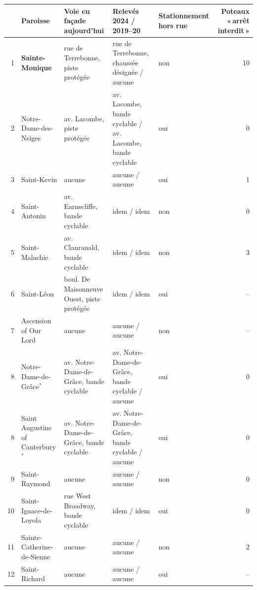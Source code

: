 \begin{tabular}{@{}r>{\raggedright\arraybackslash}p{3.4cm}>{\raggedright\arraybackslash}p{4.2cm}>{\raggedright\arraybackslash}p{4.4cm}>{\raggedright\arraybackslash}p{1.7cm}r@{}}\toprule
 & Paroisse & Voie en façade aujourd'hui & Relevés 2024 / 2019--20 & Stationnement hors rue & Poteaux «\,arrêt interdit\,» \\\midrule
1 & \textbf{Sainte-Monique} & rue de Terrebonne, piste protégée & rue de Terrebonne, chaussée désignée / aucune & non & 10 \\
2 & Notre-Dame-des-Neiges & av. Lacombe, piste protégée & av. Lacombe, bande cyclable / av. Lacombe, bande cyclable & oui & 0 \\
3 & Saint-Kevin & aucune & aucune / aucune & oui & 1 \\
4 & Saint-Antonin & av. Earnscliffe, bande cyclable & idem / idem & non & 0 \\
5 & Saint-Malachie & av. Clanranald, bande cyclable & idem / idem & non & 3 \\
6 & Saint-Léon & boul. De Maisonneuve Ouest, piste protégée & idem / idem & oui & -- \\
7 & Ascension of Our Lord & aucune & aucune / aucune & non & -- \\
8 & Notre-Dame-de-Grâce$^{*}$ & av. Notre-Dame-de-Grâce, bande cyclable & av. Notre-Dame-de-Grâce, bande cyclable / aucune & oui & 0 \\
8 & Saint Augustine of Canterbury$^{*}$ & av. Notre-Dame-de-Grâce, bande cyclable & av. Notre-Dame-de-Grâce, bande cyclable / aucune & oui & 0 \\
9 & Saint-Raymond & aucune & aucune / aucune & non & 0 \\
10 & Saint-Ignace-de-Loyola & rue West Broadway, bande cyclable & idem / idem & oui & 0 \\
11 & Sainte-Catherine-de-Sienne & aucune & aucune / aucune & non & 2 \\
12 & Saint-Richard & aucune & aucune / aucune & oui & -- \\
\bottomrule
\end{tabular}
